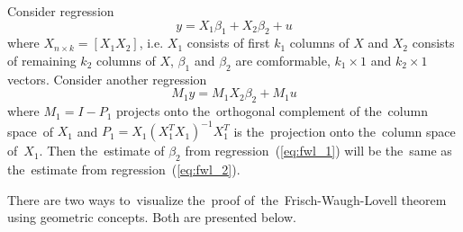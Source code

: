 \begin{theorem}
Consider regression
\begin{equation} \label{eq:fwl_1}
y = X_1 \beta_1 + X_2 \beta_2 + u
\end{equation}
where $X_{n \times k} = [X_1 X_2]$, i.e. $X_1$ consists of first $k_1$ columns of $X$ and $X_2$ consists of remaining $k_2$ columns of $X$,
$\beta_1$ and $\beta_2$ are comformable, $k_1 \times 1$ and $k_2 \times 1$ vectors.
Consider another regression
\begin{equation}  \label{eq:fwl_2}
M_1 y = M_1 X_2 \beta_2 + M_1 u
\end{equation}
where $M_1 = I - P_1$ projects onto the~orthogonal complement of the~column space~of
$X_1$ and $P_1 = X_1(X_1^TX_1)^{-1}X_1^T$ is the~projection onto the~column space of~$X_1$.
Then the~estimate of $\beta_2$ from regression~(\ref{eq:fwl_1}) will be the~same
as the~estimate from regression~(\ref{eq:fwl_2}).
\end{theorem}

There are two ways to~visualize the~proof of~the~Frisch-Waugh-Lovell theorem
using geometric concepts. Both are presented below.

